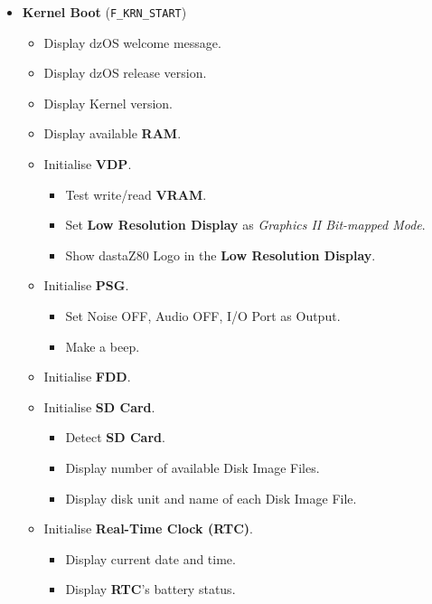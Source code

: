 \begin{itemize}
\begin{itemize}
        \end{itemize}
        \item \textbf{Kernel Boot} (\texttt{F\_KRN\_START})
        \begin{itemize}
            \item Display dzOS welcome message.
            \item Display dzOS release version.
            \item Display Kernel version.
            \item Display available \textbf{RAM}.
            \item Initialise \textbf{VDP}.
            \begin{itemize}
                \item Test write/read \textbf{VRAM}.
                \item Set \textbf{Low Resolution Display} as \textit{Graphics II
                Bit-mapped Mode}.
                \item Show dastaZ80 Logo in the \textbf{Low Resolution Display}.
            \end{itemize}
            \item Initialise \textbf{PSG}.
            \begin{itemize}
                \item Set Noise OFF, Audio OFF, I/O Port as Output.
                \item Make a beep.
            \end{itemize}
            \item Initialise \textbf{FDD}.
            \item Initialise \textbf{SD Card}.
            \begin{itemize}
                \item Detect \textbf{SD Card}.
                \item Display number of available Disk Image Files.
                \item Display disk unit and name of each Disk Image File.
            \end{itemize}
            \item Initialise \textbf{Real-Time Clock (RTC)}.
            \begin{itemize}
                \item Display current date and time.
                \item Display \textbf{RTC}'s battery status.
            \end{itemize}

\end{itemize}
\end{itemize}
